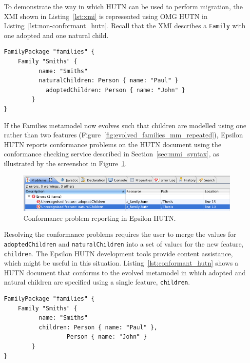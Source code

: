 To demonstrate the way in which HUTN can be used to perform migration, the XMI shown in Listing~\ref{lst:xmi} is represented using OMG HUTN in Listing~\ref{lst:non-conformant_hutn}. Recall that the XMI describes a \texttt{Fa\-mi\-ly} with one adopted and one natural child.

\begin{lstlisting}[caption=OMG HUTN for people with mothers and fathers., label=lst:non-conformant_hutn, language=HutnFamilies]
FamilyPackage "families" {
    Family "Smiths" {
	      name: "Smiths"
	      naturalChildren: Person { name: "Paul" }
		    adoptedChildren: Person { name: "John" }
		}
}
\end{lstlisting}

If the Families metamodel now evolves such that children are modelled using one rather than two features (Figure~\ref{fig:evolved_families_mm_repeated}), Epsilon HUTN reports conformance problems on the HUTN document using the conformance checking service described in Section~\ref{sec:mmi_syntax}, as illustrated by the screenshot in Figure~\ref{fig:hutn_conformance_reporting}.

\begin{figure}[htbp]
  \begin{center}
    \leavevmode
    \includegraphics[scale=0.44]{5.Implementation/hutn_conformance_reporting.png}
  \end{center}
  \caption{Conformance problem reporting in Epsilon HUTN.}
  \label{fig:hutn_conformance_reporting}
\end{figure}

Resolving the conformance problems requires the user to merge the values for \texttt{ad\-op\-t\-edCh\-il\-dr\-en} and \texttt{na\-tu\-ralCh\-il\-dr\-en} into a set of values for the new feature, \texttt{ch\-il\-dr\-en}. The Epsilon HUTN development tools provide content assistance, which might be useful in this situation. Listing~\ref{lst:conformant_hutn} shows a HUTN document that conforms to the evolved metamodel in which adopted and natural children are specified using a single feature, \texttt{ch\-il\-dr\-en}.

\begin{lstlisting}[caption=HUTN for people with parents., label=lst:conformant_hutn, language=HutnFamilies]
FamilyPackage "families" {
    Family "Smiths" {
	      name: "Smiths"
	      children: Person { name: "Paul" },
                  Person { name: "John" }
		}
}
\end{lstlisting}

